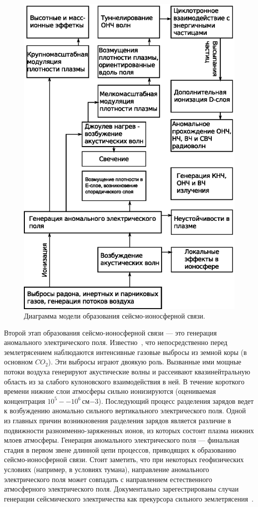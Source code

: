 \documentclass[12pt, oneside, a4paper]{article}
\begin{document}
\begin{figure}[H]
    \centering
    \includegraphics*[width=0.8\columnwidth]{process-chain}
    \caption{Диаграмма модели образования сейсмо-ионосферной связи.}
    \label{fig:process-chain}
\end{figure}

Второй этап образования сейсмо-ионосферной связи --- это генерация аномального электрического поля. Известно~\cite{Voitov_Dobrovolsky:1994}, что непосредственно перед землетрясением наблюдаются интенсивные газовые выбросы из земной коры (в основном $CO_2$). Эти выбросы играют двоякую роль. Вызванные ими мощные потоки воздуха генерируют акустические волны и рассеивают квазинейтральную область из за слабого кулоновского взаимодействия в ней. В  течение короткого времени нижние слои атмосферы сильно ионизируются (оцениваемая концентрация $10^5--10^6$\,см$-3$). Последующий процесс разделения зарядов ведет к возбуждению аномально сильного вертикального электрического поля. Одной из главных причин возникновения разделения зарядов является различие в подвижности разноименно-заряженных ионов, из которых состоит плазма нижних млоев атмосферы. Генерация аномального электрического поля --- финальная стадия в первом звене длинной цепи процессов, приводящих к образованию сейсмо-ионосферной связи. Стоит заметить, что при некоторых геофизических условиях (например, в условиях тумана), направление аномального электрического поля может совпадать с направлением естественного атмосферного электрического поля. Документально зарегестрированы случаи генерации сейсмического электричества как прекурсора сильного землетрясения~\cite{Jianguo:1989,Vershinin:1999}.
\end{document}
